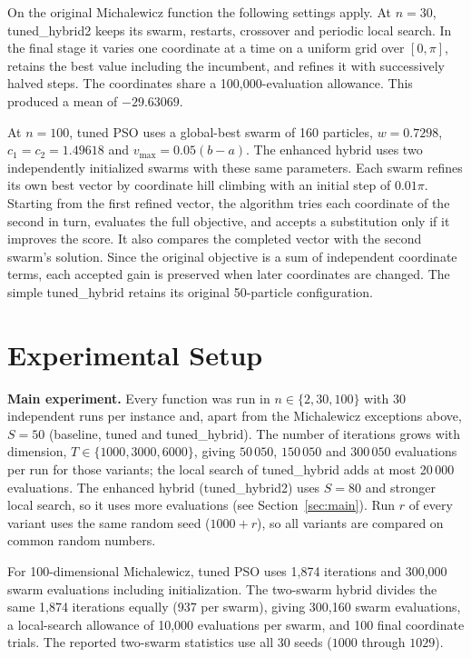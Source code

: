 \documentclass[conference]{IEEEtran}
\begin{document}
On the original Michalewicz function the following settings apply. At
$n=30$, tuned\_hybrid2 keeps its swarm, restarts, crossover and periodic
local search. In the final stage it varies one coordinate at a time on a
uniform grid over $[0,\pi]$, retains the best value including the incumbent,
and refines it with successively halved steps. The coordinates share a
100,000-evaluation allowance. This produced a mean of $-29.63069$.

At $n=100$, tuned PSO uses a global-best swarm of 160 particles,
$w=0.7298$, $c_1=c_2=1.49618$ and $v_{\max}=0.05(b-a)$.
The enhanced hybrid uses two independently initialized swarms with these
same parameters. Each swarm refines its own best vector by coordinate
hill climbing with an initial step of $0.01\pi$. Starting from the first
refined vector, the algorithm tries each coordinate of the second in turn,
evaluates the full objective, and accepts a substitution only if it improves
the score. It also compares the completed vector with the second swarm's
solution. Since the original objective is a sum of independent coordinate
terms, each accepted gain is preserved when later coordinates are changed.
The simple tuned\_hybrid retains its original 50-particle configuration.


\section{Experimental Setup}\label{sec:setup}
\textbf{Main experiment.} Every function was run in $n\in\{2,30,100\}$
with 30 independent runs per instance and, apart from the Michalewicz exceptions above, $S=50$ (baseline, tuned and
tuned\_hybrid). The number of iterations grows with dimension,
$T\in\{1000,3000,6000\}$, giving $50\,050$, $150\,050$ and $300\,050$
evaluations per run for those variants; the local search of tuned\_hybrid
adds at most 20\,000 evaluations. The enhanced hybrid (tuned\_hybrid2) uses
$S=80$ and stronger local search, so it uses more evaluations (see
Section~\ref{sec:main}). Run $r$ of every variant uses the same random seed
($1000+r$), so all variants are compared on common random numbers.

For 100-dimensional Michalewicz, tuned PSO uses 1,874 iterations
and 300,000 swarm evaluations including initialization. The two-swarm
hybrid divides the same 1,874 iterations equally (937 per swarm),
giving 300,160 swarm evaluations, a local-search allowance of 10,000
evaluations per swarm, and 100 final coordinate trials. The reported
two-swarm statistics use all 30 seeds ($1000$ through $1029$).
\end{document}
